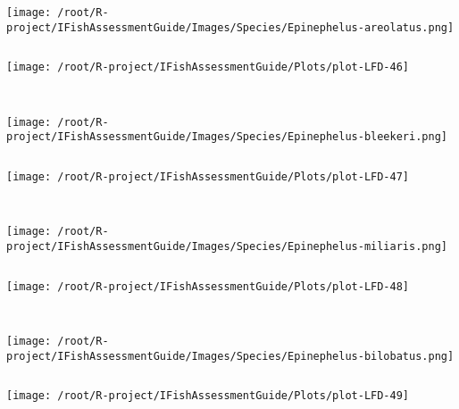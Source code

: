 \begin{knitrout}
\begin{kframe}
\begin{verbatim}
\end{verbatim}
\end{kframe}
\texttt{[image: /root/R-project/IFishAssessmentGuide/Images/Species/Epinephelus-areolatus.png]}
\begin{kframe}\begin{verbatim}
\end{verbatim}
\end{kframe}
\texttt{[image: /root/R-project/IFishAssessmentGuide/Plots/plot-LFD-46]} 
\begin{kframe}\begin{verbatim}
 
\end{verbatim}
\end{kframe}
\texttt{[image: /root/R-project/IFishAssessmentGuide/Images/Species/Epinephelus-bleekeri.png]}
\begin{kframe}\begin{verbatim}
\end{verbatim}
\end{kframe}
\texttt{[image: /root/R-project/IFishAssessmentGuide/Plots/plot-LFD-47]} 
\begin{kframe}\begin{verbatim}
 
\end{verbatim}
\end{kframe}
\texttt{[image: /root/R-project/IFishAssessmentGuide/Images/Species/Epinephelus-miliaris.png]}
\begin{kframe}\begin{verbatim}
\end{verbatim}
\end{kframe}
\texttt{[image: /root/R-project/IFishAssessmentGuide/Plots/plot-LFD-48]} 
\begin{kframe}\begin{verbatim}
 
\end{verbatim}
\end{kframe}
\texttt{[image: /root/R-project/IFishAssessmentGuide/Images/Species/Epinephelus-bilobatus.png]}
\begin{kframe}\begin{verbatim}
\end{verbatim}
\end{kframe}
\texttt{[image: /root/R-project/IFishAssessmentGuide/Plots/plot-LFD-49]} 
\begin{kframe}\begin{verbatim}
 

\end{verbatim}
\end{kframe}
\end{knitrout}

